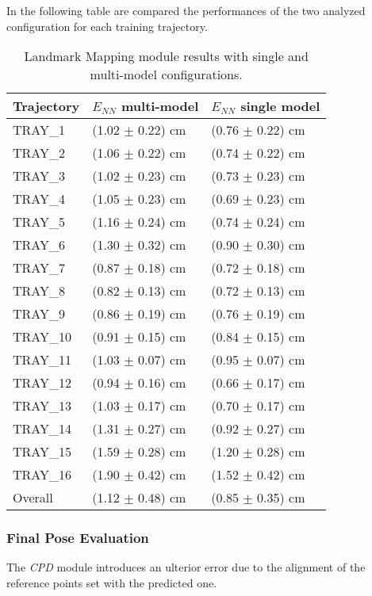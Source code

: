 In the following table are compared the performances of the two analyzed configuration for each training trajectory.
\begin{table}[H]
\label{tab:3DErrorResultTrain}
\centering
\begin{tabular}{l | l l }
\toprule
Trajectory & $E_{NN}$ multi-model & $E_{NN}$ single model\\
\midrule
TRAY\_1 & (1.02 $\pm$ 0.22) cm & (0.76 $\pm$ 0.22) cm\\
TRAY\_2 & (1.06 $\pm$ 0.22) cm & (0.74 $\pm$ 0.22) cm \\
TRAY\_3 & (1.02 $\pm$ 0.23) cm & (0.73 $\pm$ 0.23) cm \\
TRAY\_4 & (1.05 $\pm$ 0.23) cm & (0.69 $\pm$ 0.23) cm \\
TRAY\_5 & (1.16 $\pm$ 0.24) cm & (0.74 $\pm$ 0.24) cm \\
TRAY\_6 & (1.30 $\pm$ 0.32) cm & (0.90 $\pm$ 0.30) cm \\
TRAY\_7 & (0.87 $\pm$ 0.18) cm & (0.72 $\pm$ 0.18) cm \\
TRAY\_8 & (0.82 $\pm$ 0.13) cm & (0.72 $\pm$ 0.13) cm \\
TRAY\_9 & (0.86 $\pm$ 0.19) cm & (0.76 $\pm$ 0.19) cm \\
TRAY\_10 & (0.91 $\pm$ 0.15) cm & (0.84 $\pm$ 0.15) cm \\
TRAY\_11 & (1.03 $\pm$ 0.07) cm & (0.95 $\pm$ 0.07) cm \\
TRAY\_12 & (0.94 $\pm$ 0.16) cm & (0.66 $\pm$ 0.17) cm \\
TRAY\_13 & (1.03 $\pm$ 0.17) cm & (0.70 $\pm$ 0.17) cm \\
TRAY\_14 & (1.31 $\pm$ 0.27) cm & (0.92 $\pm$ 0.27) cm \\
TRAY\_15 & (1.59 $\pm$ 0.28) cm & (1.20 $\pm$ 0.28) cm \\
TRAY\_16 & (1.90 $\pm$ 0.42) cm & (1.52 $\pm$ 0.42) cm \\
\midrule
Overall & (1.12 $\pm$ 0.48) cm & (0.85 $\pm$ 0.35) cm \\
\bottomrule
\end{tabular}
\caption{Landmark Mapping module results with single and multi-model configurations.}
\end{table}

\newpage
\subsubsection{Final Pose Evaluation}

The \textit{CPD} module introduces an ulterior error due to the alignment of the reference points set with the predicted one.

